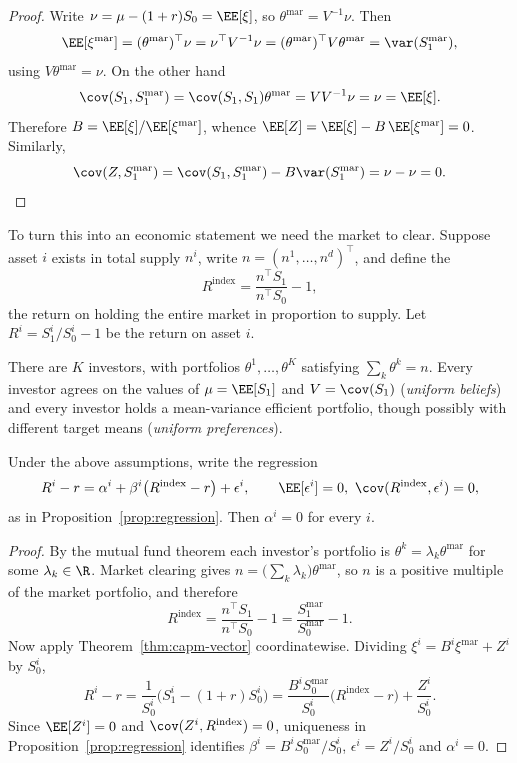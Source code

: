 \begin{proof}
	Write $\nu = \mu - (1+r)S_0 = \EE[\xi]$, so $\theta^{\mathrm{mar}} = V^{-1}\nu$. Then
	$$
	\EE[\xi^{\mathrm{mar}}] = (\theta^{\mathrm{mar}})^\top \nu = \nu^\top V^{-1}\nu = (\theta^{\mathrm{mar}})^\top V \theta^{\mathrm{mar}} = \var(S_1^{\mathrm{mar}}),
	$$
	using $V\theta^{\mathrm{mar}} = \nu$. On the other hand
	$$
	\cov(S_1, S_1^{\mathrm{mar}}) = \cov(S_1,S_1)\theta^{\mathrm{mar}} = V V^{-1}\nu = \nu = \EE[\xi].
	$$
	Therefore $B = \EE[\xi]/\EE[\xi^{\mathrm{mar}}]$, whence $\EE[Z] = \EE[\xi] - B\,\EE[\xi^{\mathrm{mar}}] = 0$. Similarly,
	$$
	\cov(Z, S_1^{\mathrm{mar}}) = \cov(S_1,S_1^{\mathrm{mar}}) - B\var(S_1^{\mathrm{mar}}) = \nu - \nu = 0. \qedhere
	$$
\end{proof}

To turn this into an economic statement we need the market to clear. Suppose asset $i$ exists in total supply $n^i$, write $n = (n^1,\dots,n^d)^\top$, and define the 
$$
R^{\mathrm{index}} = \frac{n^\top S_1}{n^\top S_0} - 1,
$$
the return on holding the entire market in proportion to supply. Let $R^i = S_1^i/S_0^i - 1$ be the return on asset $i$.

\begin{axiom}
	There are $K$ investors, with portfolios $\theta^1, \dots, \theta^K$ satisfying  $\sum_{k} \theta^k = n$. Every investor agrees on the values of $\mu = \EE[S_1]$ and $V = \cov(S_1)$ (\emph{uniform beliefs}) and every investor holds a mean-variance efficient portfolio, though possibly with different target means (\emph{uniform preferences}).
\end{axiom}

\begin{theorem}
	Under the above assumptions, write the regression
	$$
	R^i - r = \alpha^i + \beta^i\big(R^{\mathrm{index}} - r\big) + \epsilon^i, \qquad \EE[\epsilon^i]=0,\ \cov(R^{\mathrm{index}},\epsilon^i) = 0,
	$$
	as in Proposition~\ref{prop:regression}. Then $\alpha^i = 0$ for every $i$.
\end{theorem}

\begin{proof}
	By the mutual fund theorem each investor's portfolio is $\theta^k = \lambda_k \theta^{\mathrm{mar}}$ for some $\lambda_k \in \R$. Market clearing gives $n = \big(\sum_k \lambda_k\big)\theta^{\mathrm{mar}}$, so $n$ is a positive multiple of the market portfolio, and therefore
	$$
	R^{\mathrm{index}} = \frac{n^\top S_1}{n^\top S_0} - 1 = \frac{S_1^{\mathrm{mar}}}{S_0^{\mathrm{mar}}} - 1.
	$$
	Now apply Theorem~\ref{thm:capm-vector} coordinatewise. Dividing $\xi^i = B^i \xi^{\mathrm{mar}} + Z^i$ by $S_0^i$,
	$$
	R^i - r = \frac{1}{S_0^i}\big(S_1^i - (1+r)S_0^i\big) = \frac{B^i S_0^{\mathrm{mar}}}{S_0^i}\big(R^{\mathrm{index}} - r\big) + \frac{Z^i}{S_0^i}.
	$$
	Since $\EE[Z^i] = 0$ and $\cov(Z^i, R^{\mathrm{index}}) = 0$, uniqueness in Proposition~\ref{prop:regression} identifies $\beta^i = B^iS_0^{\mathrm{mar}}/S_0^i$, $\epsilon^i = Z^i/S_0^i$ and $\alpha^i = 0$.
\end{proof}

